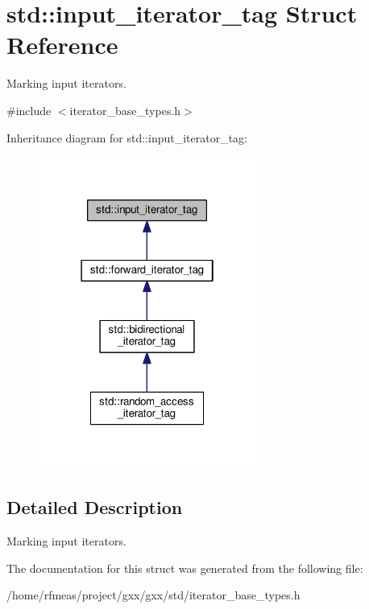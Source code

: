 \hypertarget{structstd_1_1input__iterator__tag}{}\section{std\+:\+:input\+\_\+iterator\+\_\+tag Struct Reference}
\label{structstd_1_1input__iterator__tag}


Marking input iterators.  




{\ttfamily \#include $<$iterator\+\_\+base\+\_\+types.\+h$>$}



Inheritance diagram for std\+:\+:input\+\_\+iterator\+\_\+tag\+:
\nopagebreak
\begin{figure}[H]
\begin{center}
\leavevmode
\includegraphics[width=202pt]{structstd_1_1input__iterator__tag__inherit__graph}
\end{center}
\end{figure}


\subsection{Detailed Description}
Marking input iterators. 

The documentation for this struct was generated from the following file\+:\begin{DoxyCompactItemize}
\item 
/home/rfmeas/project/gxx/gxx/std/iterator\+\_\+base\+\_\+types.\+h\end{DoxyCompactItemize}
